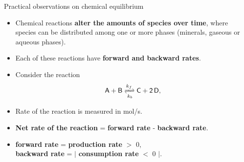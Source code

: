 %
\begin{frame}{Practical observations on chemical equilibrium}
\vskip 10pt
\begin{itemize}
\item Chemical reactions \textbf{alter the amounts of species over time}, where species can be distributed among one or more phases (minerals, gaseous or aqueous phases).
\pause
\item Each of these reactions have \textbf{forward and backward rates}. 
\pause
\item Consider the reaction
\[
\mathsf{A+B \xrightleftharpoons[k_b]{k_f} C+2\,D,}
\]
\pause
\item Rate of the reaction is measured in mol/s.
\pause
\item \alert{\textbf{Net rate of the reaction}} = \textbf{forward rate} - \textbf{backward rate}. 
\pause 
\item 
\textbf{forward rate} = \textbf{production rate} $>$ 0, \\
\textbf{backward rate} = $|$ \textbf{consumption rate} $<$ 0 $|$.
\end{itemize}
\end{frame}

